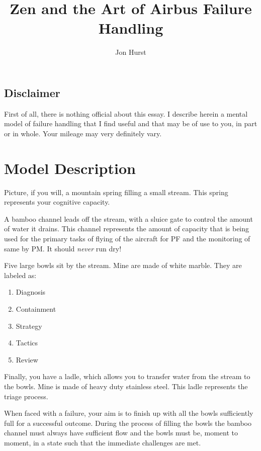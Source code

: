 \documentclass[a5paper,11pt,titlepage]{article} \usepackage[utf8]{inputenc}
\title{Zen and the Art of Airbus Failure Handling}
\author{Jon Hurst}
\begin{document}
\maketitle

\begin{tcolorbox}[colframe=red]
\section*{Disclaimer}

First of all, there is nothing official about this essay. I describe
herein a mental model of failure handling that I find useful and that
may be of use to you, in part or in whole. Your mileage may very
definitely vary.

\end{tcolorbox}

\section{Model Description}

Picture, if you will, a mountain spring filling a small stream. This
spring represents your cognitive capacity.

A bamboo channel leads off the stream, with a sluice gate to control the
amount of water it drains. This channel represents the amount of
capacity that is being used for the primary tasks of flying of the
aircraft for PF and the monitoring of same by PM. It should \emph{never}
run dry!

Five large bowls sit by the stream. Mine are made of white marble. They
are labeled as:

\begin{enumerate}
\item Diagnosis
\item Containment
\item Strategy
\item Tactics
\item Review
\end{enumerate}

Finally, you have a ladle, which allows you to transfer water from the
stream to the bowls. Mine is made of heavy duty stainless steel. This
ladle represents the triage process.

When faced with a failure, your aim is to finish up with all the bowls
sufficiently full for a successful outcome. During the process of
filling the bowls the bamboo channel must always have sufficient
flow and the bowls must be, moment to moment, in a state such that the
immediate challenges are met.
\end{document}
